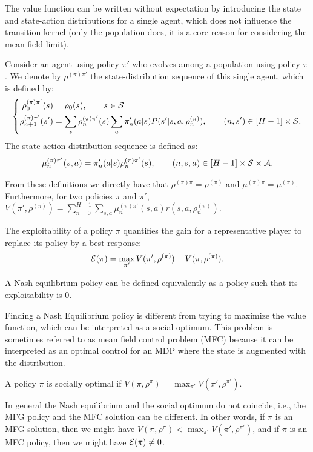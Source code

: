 \documentclass{article}
\begin{document}
The value function can be written without expectation by introducing the state and state-action distributions for a single agent, which does not influence the transition kernel (only the population does, it is a core reason for considering the mean-field limit).  
\begin{definition}
Consider an agent using policy $\pi'$ who evolves among a population using policy $\pi$. We denote by $\rho^{(\pi)\pi'}$ the state-distribution sequence of this single agent, which is defined by:
\begin{equation}
    \left\{ 
    \begin{split}
    \rho_0^{(\pi)\pi'}(s) &= \rho_0(s), \qquad s \in \mathcal{S}
    \\
    \rho_{n+1}^{(\pi)\pi'}(s') &= \sum_s \rho_n^{(\pi)\pi'}(s) \sum_a \pi'_n(a|s) P(s'|s,a,\rho_n^{(\pi)}), \qquad (n,s') \in [H-1] \times \mathcal{S}.
    \end{split}
    \right.
\end{equation}
The state-action distribution sequence is defined as:
\begin{equation}
    \mu_n^{(\pi)\pi'}(s,a) = \pi'_n(a|s) \rho^{(\pi)\pi'}_n(s), \qquad  (n,s,a) \in [H-1] \times \mathcal{S} \times \mathcal{A}.
\end{equation}
\end{definition}
From these definitions we directly have that $\rho^{(\pi)\pi} = \rho^{(\pi)}$ and $\mu^{(\pi)\pi} = \mu^{(\pi)}$. Furthermore, for two policies $\pi$ and $\pi'$,  $V(\pi',\rho^{(\pi)})=\sum_{n=0}^{H-1} \sum_{s,a} \mu_n^{(\pi)\pi'}(s,a) r(s,a,\rho_n^{(\pi)})$. 

\begin{definition}[Exploitability]
The exploitability of a policy $\pi$ quantifies the gain for a representative player to replace its policy by a best response:
\begin{equation}
    \mathcal{E}(\pi) = \max_{\pi'} V(\pi',\rho^{(\pi)}) - V(\pi, \rho^{(\pi)}).
\end{equation}
\end{definition}
A Nash equilibrium policy can be defined equivalently as a policy such that its exploitability is $0$. 

Finding a Nash Equilibrium policy is different from trying to maximize the value function, which can be interpreted as a social optimum. This problem is sometimes referred to as mean field control problem (MFC) because it can be interpreted as an optimal control for an MDP where the state is augmented with the distribution. 
\begin{definition}
\label{def:social-opt}
A policy $\pi$ is socially optimal if $V(\pi, \rho^\pi) = \max_{\pi'}V(\pi',\rho^{\pi'})$.
\end{definition}
In general the Nash equilibrium and the social optimum do not coincide, i.e., the MFG policy and the MFC solution can be different. In other words, if $\pi$ is an MFG solution, then we might have $V(\pi, \rho^\pi) < \max_{\pi'}V(\pi',\rho^{\pi'})$, and if $\pi$ is an MFC policy, then we might have $\mathcal{E}(\pi) \ne 0$.
\end{document}
